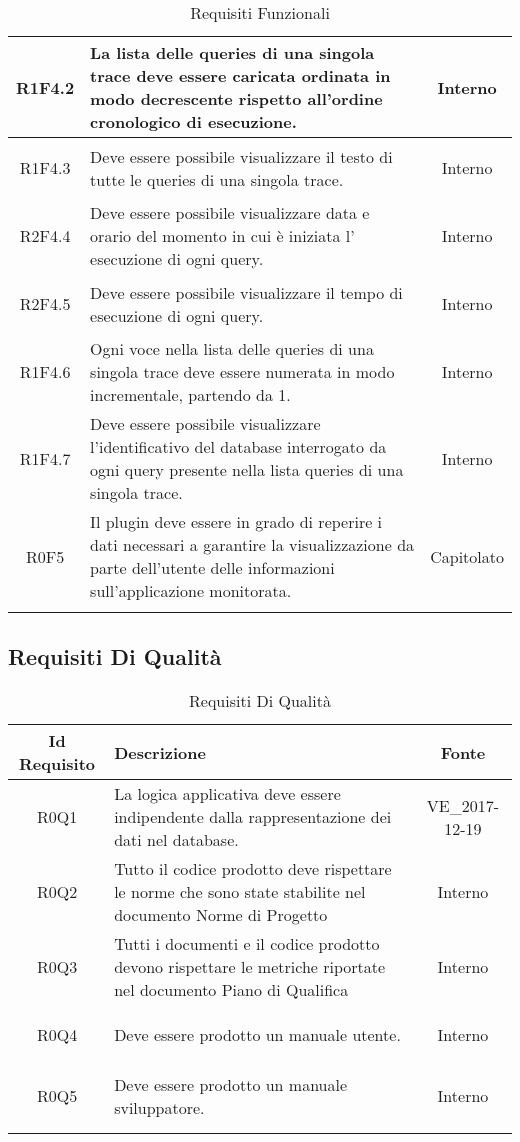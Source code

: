 \begin{longtable}{|c|H|c|}
\hypertarget{R1F4.2}{R1F4.2} & La lista delle queries di una singola trace deve essere caricata ordinata in modo decrescente rispetto all'ordine cronologico di esecuzione. & Interno \\ \hline 
\hypertarget{R1F4.3}{R1F4.3} & Deve essere possibile visualizzare il testo di tutte le queries di una singola trace. & Interno \\ \hline 
\hypertarget{R2F4.4}{R2F4.4} & Deve essere possibile visualizzare data e orario del momento in cui è iniziata l' esecuzione di ogni query. & Interno \\ \hline 
\hypertarget{R2F4.5}{R2F4.5} & Deve essere possibile visualizzare il tempo di esecuzione di ogni query. & Interno \\ \hline 
\hypertarget{R1F4.6}{R1F4.6} & Ogni voce nella lista delle queries di una singola trace deve essere numerata in modo incrementale, partendo da 1. & Interno \\ \hline 
\hypertarget{R1F4.7}{R1F4.7} & Deve essere possibile visualizzare l'identificativo del database interrogato da ogni query presente nella lista queries di una singola trace. & Interno \\ \hline 
\hypertarget{R0F5}{R0F5} &  Il plugin deve essere in grado di reperire i dati necessari a garantire la visualizzazione da parte dell'utente delle informazioni sull'applicazione monitorata. & Capitolato  \\ \hline 
\caption[Requisiti Funzionali]{Requisiti Funzionali}
\label{tabella:req0}
\end{longtable}
\clearpage
{}
\subsection{Requisiti Di Qualità}
\normalsize
\begin{longtable}{|c|H|c|}
\hline
\textbf{Id Requisito} & \textbf{Descrizione} & \textbf{Fonte}\\
\hline
\endhead
\hypertarget{R0Q1}{R0Q1} & La logica applicativa deve essere indipendente dalla rappresentazione dei dati nel database. & VE\_2017-12-19 \\ \hline 
\hypertarget{R0Q2}{R0Q2} & Tutto il codice prodotto deve rispettare le norme che sono state stabilite nel documento Norme di Progetto & Interno \\ \hline 
\hypertarget{R0Q3}{R0Q3} & Tutti i documenti e il codice prodotto devono rispettare le metriche riportate nel documento Piano di Qualifica & Interno \\ \hline 
\hypertarget{R0Q4}{R0Q4} & Deve essere prodotto un manuale utente. & Interno \\ \hline 
\hypertarget{R0Q5}{R0Q5} & Deve essere prodotto un manuale sviluppatore. & Interno \\ \hline 
\caption[Requisiti Di Qualità]{Requisiti Di Qualità}
\label{tabella:req1}
\end{longtable}
\clearpage
{}
